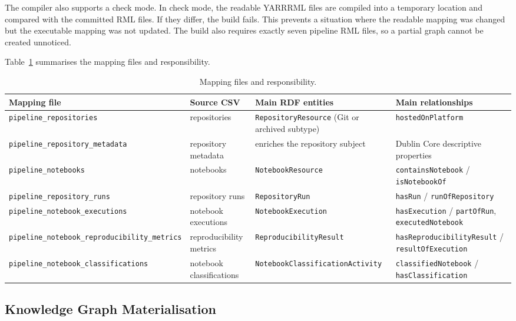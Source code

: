 The compiler also supports a check mode. In check mode, the readable YARRRML files are compiled into a temporary location and compared with the committed RML files. If they differ, the build fails. This prevents a situation where the readable mapping was changed but the executable mapping was not updated. The build also requires exactly seven pipeline RML files, so a partial graph cannot be created unnoticed.

Table~\ref{tab:mapping-files} summarises the mapping files and responsibility.

\begin{table}[ht]
\centering
\caption{Mapping files and responsibility.}
\label{tab:mapping-files}
\footnotesize
\begin{tabularx}{\textwidth}{@{}p{4.2cm}p{2.1cm}p{3.6cm}X@{}}
\toprule
Mapping file & Source CSV & Main RDF entities & Main relationships\tabularnewline
\midrule
\texttt{pipeline\_repositories} & repositories & \texttt{RepositoryResource} (Git or archived subtype) & \texttt{hostedOnPlatform}\tabularnewline
\texttt{pipeline\_repository\_}\linebreak\texttt{metadata} & repository metadata & enriches the repository subject & Dublin Core descriptive properties\tabularnewline
\texttt{pipeline\_notebooks} & notebooks & \texttt{NotebookResource} & \texttt{containsNotebook} / \texttt{isNotebookOf}\tabularnewline
\texttt{pipeline\_repository\_runs} & repository runs & \texttt{RepositoryRun} & \texttt{hasRun} / \texttt{runOfRepository}\tabularnewline
\texttt{pipeline\_notebook\_}\linebreak\texttt{executions} & notebook executions & \texttt{NotebookExecution} & \texttt{hasExecution} / \texttt{partOfRun}, \texttt{executedNotebook}\tabularnewline
\texttt{pipeline\_notebook\_}\linebreak\texttt{reproducibility\_metrics} & reproducibility metrics & \texttt{ReproducibilityResult} & \texttt{hasReproducibilityResult} / \texttt{resultOfExecution}\tabularnewline
\texttt{pipeline\_notebook\_}\linebreak\texttt{classifications} & notebook classifications & \texttt{NotebookClassification}\linebreak\texttt{Activity} & \texttt{classifiedNotebook} / \texttt{hasClassification}\tabularnewline
\bottomrule
\end{tabularx}
\end{table}

\subsection{Knowledge Graph Materialisation}

